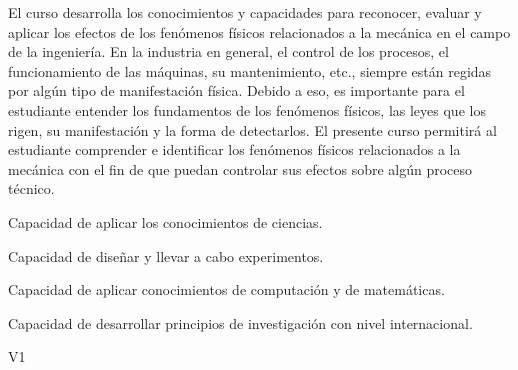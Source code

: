 \begin{syllabus}


\begin{justification}
   El curso desarrolla los conocimientos y capacidades para reconocer, evaluar y aplicar los efectos de los fenómenos físicos relacionados a la mecánica en el campo de la ingeniería. En la industria en general, el control de los procesos, el funcionamiento de las máquinas, su mantenimiento, etc., siempre están regidas por algún tipo de manifestación física. Debido a eso, es importante para el estudiante entender los fundamentos de los fenómenos físicos, las leyes que los rigen, su manifestación y la forma de detectarlos. El presente curso permitirá al estudiante comprender e identificar los fenómenos físicos relacionados a la mecánica con el fin de que puedan controlar sus efectos sobre algún proceso técnico. 
\end{justification}

\begin{goals}
\item Capacidad de aplicar los conocimientos de ciencias.
\item Capacidad de diseñar y llevar a cabo experimentos.
\item Capacidad de aplicar conocimientos de computación y de matemáticas.
\item Capacidad de desarrollar principios de investigación con nivel internacional.
\end{goals}

\begin{outcomes}{V1}
    \item {}
    \item {}
    \item {}
    \item {}
\end{outcomes}


\end{syllabus}
